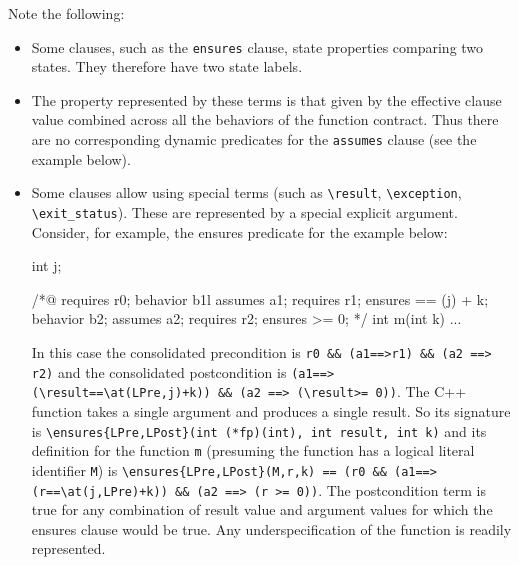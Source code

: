 Note the following:
\begin{itemize}
	\item Some clauses, such as the \lstinline|ensures| clause,
	state properties comparing two states. They therefore have two state labels.
	\item The property represented by these terms is that
	given by the effective clause value combined across all the
	behaviors of the function contract. Thus there are no
	corresponding dynamic predicates for the \lstinline|assumes| clause (see the example below).
	\item Some clauses allow using special terms (such as 
	\lstinline|\result|, 
	\lstinline|\exception|, \lstinline|\exit_status|). 
	These are represented by a special explicit argument. Consider, for example, the ensures predicate for the example below:
\begin{listing-nonumber}
int j;
		
/*@
requires r0;
behavior b1l
  assumes a1;
  requires r1;
  ensures \result == \old(j) + k;
behavior b2;
  assumes a2;
  requires r2;
  ensures \result >= 0;
*/
int m(int k) { ... }
\end{listing-nonumber}

	In this case the consolidated precondition is
	\lstinline|r0 && (a1==>r1) && (a2 ==> r2)|
	and the consolidated postcondition is 
	\lstinline|(a1==>(\result==\at(LPre,j)+k)) && (a2 ==> (\result>= 0))|.
	The C++ function takes a single argument and produces a single result. So its signature is
	\lstinline|\ensures{LPre,LPost}(int (*fp)(int), int result, int k)|	
	and its definition for the function \lstinline|m| (presuming the function has a logical literal identifier \lstinline|M|) is
	\lstinline|\ensures{LPre,LPost}(M,r,k) == (r0 && (a1==>(r==\at(j,LPre)+k)) && (a2 ==> (r >= 0))|.
	The postcondition term is true for any combination of 
	result value and argument values for which the ensures clause would be true. Any underspecification of the function is readily represented.

\end{itemize}

